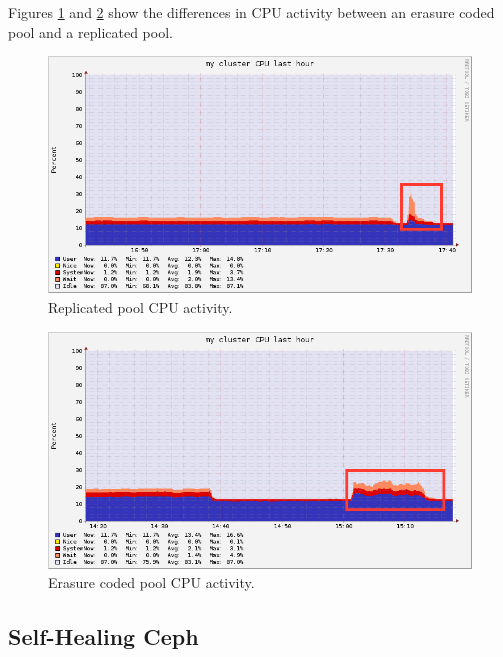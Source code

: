\documentclass[conference,compsoc]{IEEEtran}
\begin{document}
Figures \ref{fig:ReplicationCpuReport} and \ref{fig:ErasureCpuReport} show the differences in CPU activity between an erasure coded pool and a replicated pool. 

\begin{figure}

\includegraphics[width=\linewidth]{replication_cpu_report.png}
\caption{Replicated pool CPU activity.}
\label{fig:ReplicationCpuReport}

\end{figure}    

\begin{figure}

\includegraphics[width=\linewidth]{erasure_cpu_report.png}
\caption{Erasure coded pool CPU activity.}
\label{fig:ErasureCpuReport}

\end{figure}    

\subsection{Self-Healing Ceph}
\end{document}
